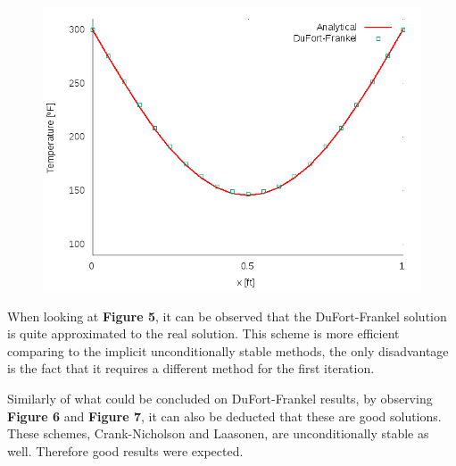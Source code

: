 \documentclass[12pt]{report}
\begin{document}
\begin{figure}[!htb]
  \centering
  \includegraphics[width=.5\linewidth]{DuFort-Frankelt_0_5.png}
\end{figure}

\par When looking at \textbf{Figure 5}, it can be observed that the DuFort-Frankel solution is quite approximated to the real solution. This scheme is more efficient comparing to the implicit unconditionally stable methods, the only disadvantage is the fact that it requires a different method for the first iteration.

\par Similarly of what could be concluded on DuFort-Frankel results, by observing \textbf{Figure 6} and \textbf{Figure 7}, it can also be deducted that these are good solutions. These schemes, Crank-Nicholson and Laasonen, are unconditionally stable as well. Therefore good results were expected.
\end{document}
